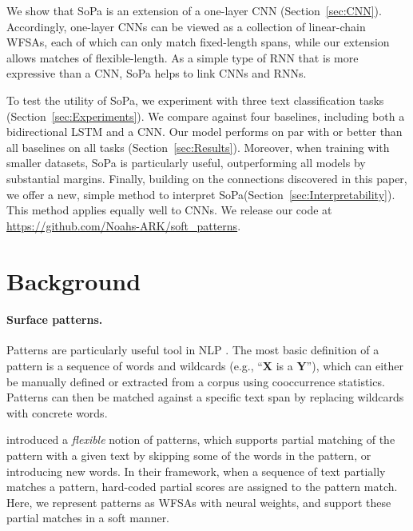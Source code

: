 \documentclass[11pt,a4paper]{article}
\renewcommand{\cite}[1]{\citep{#1}}
\newcommand{\isection}[2]{\section{#1}\label{sec:#2}}
\newcommand{\secref}[1]{Section~\ref{sec:#1}}
\newcommand{\interalia}[1]{\citep{#1}} %
\newcommand{\SoftP}{SoPa\xspace}
\newcommand{\relat}{an extension of\xspace}
\newcommand{\codeurl}{\url{https://github.com/Noahs-ARK/soft_patterns}}
\begin{document}
We show that \SoftP is \relat a one-layer CNN (\secref{CNN}).
Accordingly, one-layer CNNs can be viewed as a collection of linear-chain
WFSAs, each of which can only match fixed-length spans,
while our extension allows matches of flexible-length.
As a simple type of RNN that is more expressive than a CNN, \SoftP
helps to link CNNs and RNNs.



To test the utility of \SoftP, we experiment with three text classification tasks (\secref{Experiments}).
We compare against four baselines, including both a bidirectional LSTM and a CNN. 
Our model performs on par with or better than all baselines on all tasks (\secref{Results}). 
Moreover, when training with smaller datasets, \SoftP is particularly useful, outperforming all models by substantial margins.
Finally, building on the connections discovered in this paper, we offer a new, simple method to interpret \SoftP (\secref{Interpretability}).
This method applies equally well to CNNs.
We release our code at \codeurl.



\isection{Background}{background}

\paragraph{Surface patterns.} 
Patterns \cite{Hearst:1992} are particularly useful tool in NLP  \interalia{Lin:2003,Etzioni:2005,Schwartz:2015}. 
The most basic definition of a pattern is a sequence of words and
wildcards (e.g., ``\textbf{X} is a \textbf{Y}''), which can either be
manually defined or extracted from a corpus using cooccurrence statistics. 
Patterns can then be matched against a specific text span by replacing wildcards with concrete words. 

\citet{Davidov:2010} introduced a \emph{flexible} notion of patterns, which supports partial matching of the pattern with a given text by skipping some of the words in the pattern, or introducing new words. 
In their framework, when a sequence of text partially matches a  pattern, hard-coded partial scores are assigned to the pattern match.
Here, we represent patterns as WFSAs with neural weights, and support these partial matches in a soft manner.
\end{document}
